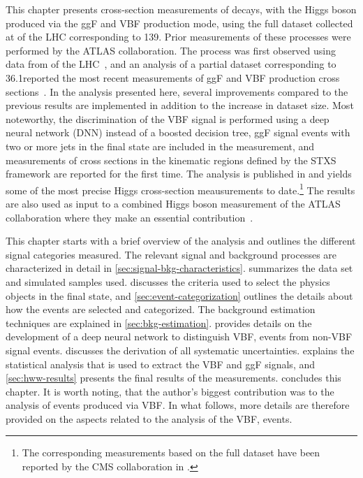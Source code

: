 This chapter presents cross-section measurements of \HWWdet decays, with the Higgs boson produced via the ggF and VBF production mode, using the full dataset collected at \RunTwo of the LHC corresponding to 139\ifb. 
Prior measurements of these processes were performed by the ATLAS collaboration. 
The \HWW process was first observed using data from \RunOne of the LHC~\cite{HIGG-2013-13}, and an analysis of a partial \RunTwo dataset corresponding to 36.1\ifb reported the most recent measurements of ggF and VBF production cross sections~\cite{HIGG-2013-13}.
In the analysis presented here, several improvements compared to the previous \RunTwo results are implemented in addition to the increase in dataset size. Most noteworthy, the discrimination of the VBF signal is performed using a deep neural network (DNN) instead of a boosted decision tree, ggF signal events with two or more jets in the final state are included in the measurement, and measurements of cross sections in the kinematic regions defined by the STXS framework are reported for the first time.
The analysis is published in  and yields some of the most precise Higgs cross-section meausurements to date.\footnote{The corresponding measurements based on the full \RunTwo dataset have been reported by the CMS collaboration in .}
The results are also used as input to a combined Higgs boson measurement of the ATLAS collaboration where they make an essential contribution~\cite{NaturePaper}.

This chapter starts with a brief overview of the analysis and outlines the different signal categories measured. 
The relevant signal and background processes are characterized in detail in \cref{sec:signal-bkg-characteristics}. 
 summarizes the data set and simulated samples used.
 discusses the criteria used to select the physics objects in the final state, and \cref{sec:event-categorization} outlines the details about how the events are selected and categorized. 
The background estimation techniques are explained in \cref{sec:bkg-estimation}. 
 provides details on the development of a deep neural network to distinguish VBF, \HWW events from non-VBF signal events. 
 discusses the derivation of all systematic uncertainties. 
 explains the statistical analysis that is used to extract the VBF and ggF signals, and \cref{sec:hww-results} presents the final results of the measurements.
 concludes this chapter.
It is worth noting, that the author's biggest contribution was to the analysis of \HWW events produced via VBF. In what follows, more details are therefore provided on the aspects related to the analysis of the VBF, \HWW events. 

